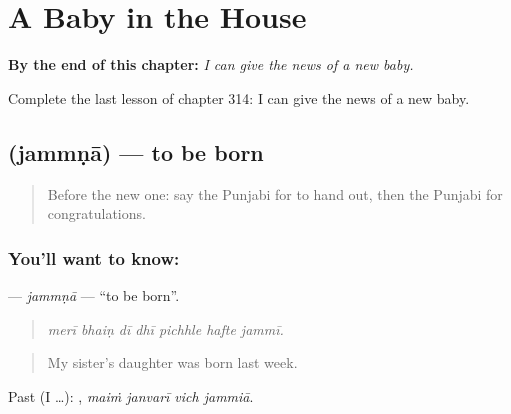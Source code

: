 
\chapter{A Baby in the House}
\label{ch:pa-a2-a-baby-in-the-house}

\begin{chapteropening}
\textbf{By the end of this chapter:} \emph{I can give the news of a new baby.}

Complete the last lesson of chapter 314: I can give the news of a new baby.
\end{chapteropening}

\section[\texorpdfstring{\pa{ਜੰਮਣਾ} (jammṇā)}{ਜੰਮਣਾ (jammṇā)}]{ (jammṇā) — to be born}

\label{lesson:PA-C314-jammna}



\begin{quote}
Before the new one: say the Punjabi for to hand out, then the Punjabi for congratulations.
\end{quote}

\subsection*{You'll want to know: }
\textbf{} — \emph{jammṇā} — \textquotedblleft{}to be born\textquotedblright{}.

\begin{quote}
      
\end{quote}

\begin{quote}
\emph{merī bhaiṇ dī dhī pichhle hafte jammī.}
\end{quote}

\begin{quote}
My sister's daughter was born last week.
\end{quote}

Past (I …):    , \emph{maiṁ janvarī vich jammiā}.

